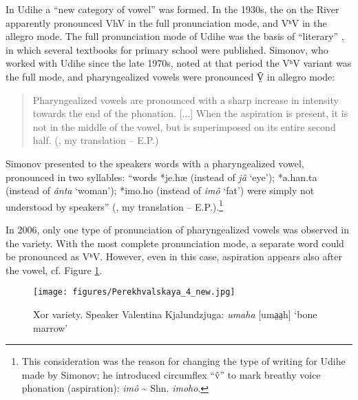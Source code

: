 \documentclass[output=paper,colorlinks,citecolor=brown]{langscibook}
\begin{document}

In  Udihe a “new category of vowel” was formed. In the 1930s, the  on the  River apparently pronounced VhV in the full pronunciation mode, and VʰV in the allegro mode. The full pronunciation mode of  Udihe was the basis of “literary” , in which several textbooks for primary school were published. Simonov, who worked with  Udihe since the late 1970s, noted at that period the VʰV variant was the full mode, and pharyngealized vowels were pronounced V̤̄ in allegro mode:

\begin{quote}
    Pharyngealized vowels are pronounced with a sharp increase in intensity towards the end of the phonation. [...] When the aspiration is present, it is not in the middle of the vowel, but is superimposed on its entire second half. (\citealt[52]{Simonov1988}, my translation – E.P.)
\end{quote}

Simonov presented to the speakers words with a pharyngealized vowel, pronounced in two syllables: “words *je.hæ (instead of \textit{jâ} ‘eye’); *a.han.ta (instead of \textit{ânta} ‘woman’); *imo.ho (instead of \textit{imô} ‘fat’) were simply not understood by speakers” (\citealt[52]{Simonov1988}, my translation – E.P.).\footnote{This consideration was the reason for changing the type of writing for  Udihe made by Simonov; he introduced circumflex “\^{v}” to mark breathy voice phonation (aspiration): \textit{imô} {\textasciitilde} Shn. \textit{imoho}.}

In 2006, only one type of pronunciation of pharyngealized vowels was observed in the  variety. With the most complete pronunciation mode, a separate word could be pronounced as VʰV. However, even in this case, aspiration appears also after the vowel, cf. Figure \ref{fig:7:4}.


\begin{figure}
\texttt{[image: figures/Perekhvalskaya\_4\_new.jpg]}
\caption{Xor variety. Speaker Valentina Kjalundzjuga: \textit{umaha} [uma{̤}a{̤}h] ‘bone marrow’}
\label{fig:7:4}
\end{figure}
\end{document}
